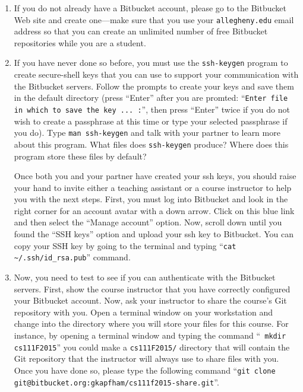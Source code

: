 \begin{enumerate}

  \item If you do not already have a Bitbucket account, please go to the Bitbucket Web site and create one---make sure
    that you use your {\tt allegheny.edu} email address so that you can create an unlimited number of free Bitbucket
    repositories while you are a student.

  \item If you have never done so before, you must use the {\tt ssh-keygen} program to create secure-shell keys that you
    can use to support your communication with the Bitbucket servers. Follow the prompts to create your keys and save
    them in the default directory (press ``Enter'' after you are promted: ``{\tt Enter file in which to save the key ...
    :}'', then press ``Enter'' twice if you do not wish to create a passphrase at this time or type your selected
    passphrase if you do).   Type {\tt man ssh-keygen} and talk with your partner to learn more about this program.
    What files does {\tt ssh-keygen} produce?  Where does this program store these files by default?

    Once both you and your partner have created your ssh keys, you should raise your hand to invite either a teaching
    assistant or a course instructor to help you with the next steps. First, you must log into Bitbucket and look in the
    right corner for an account avatar with a down arrow.  Click on this blue link and then select the ``Manage
    account'' option. Now, scroll down until you found the ``SSH keys'' option and upload your ssh key to Bitbucket. You
    can copy your SSH key by going to the terminal and typing ``{\tt cat \textasciitilde{}/.ssh/id\_rsa.pub}'' command.

  \item Now, you need to test to see if you can authenticate with the Bitbucket servers.  First, show the course
    instructor that you have correctly configured your Bitbucket account.  Now, ask your instructor to share the
    course's Git repository with you.  Open a terminal window on your workstation and change into the directory where
    you will store your files for this course.  For instance, by opening a terminal window and typing the command ``{\tt
    mkdir cs111F2015}'' you could make a {\tt cs111F2015/} directory that will contain the Git repository that the
    instructor will always use to share files with you.  Once you have done so, please type the following command 
    ``{\tt git clone git@bitbucket.org:gkapfham/cs111f2015-share.git}''.


\end{enumerate}
